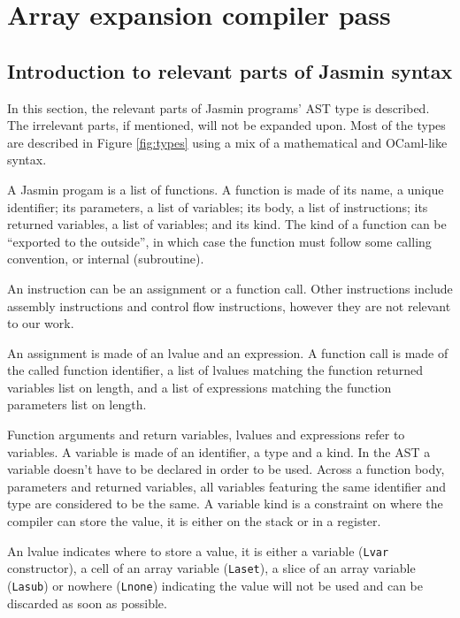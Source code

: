 \documentclass{article}
\begin{document}
\section{Array expansion compiler pass}\label{sec:syntax}

\subsection{Introduction to relevant parts of Jasmin syntax}

In this section, the relevant parts of Jasmin programs' AST type is described.
The irrelevant parts, if mentioned, will not be expanded upon. Most of the types
are described in Figure \ref{fig:types} using a mix of a mathematical and
OCaml-like syntax.

A Jasmin progam is a list of functions. A function is made of its name, a unique
identifier; its parameters, a list of variables; its body, a list of
instructions; its returned variables, a list of variables; and its kind. The
kind of a function can be ``exported to the outside'', in which case the
function must follow some calling convention, or internal (subroutine).

\smallskip

An instruction can be an assignment or a function call. Other instructions
include assembly instructions and control flow instructions, however they are
not relevant to our work.

An assignment is made of an lvalue and an expression. A function call is
made of the called function identifier, a list of lvalues matching the
function returned variables list on length, and a list of expressions matching
the function parameters list on length.

Function arguments and return variables, lvalues and expressions refer to
variables. A variable is made of an identifier, a type and a kind. In the AST a
variable doesn't have to be declared in order to be used. Across a function
body, parameters and returned variables, all variables featuring the same
identifier and type are considered to be the same. A variable kind is a
constraint on where the compiler can store the value, it is either on the stack
or in a register.

\smallskip

An lvalue indicates where to store a value, it is either a variable
(\texttt{Lvar} constructor), a cell of an array variable (\texttt{Laset}), a
slice of an array variable (\texttt{Lasub}) or nowhere (\texttt{Lnone})
indicating the value will not be used and can be discarded as soon as possible.
\end{document}
